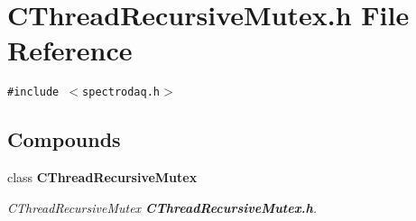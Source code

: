 \section{CThread\-Recursive\-Mutex.h File Reference}
\label{CThreadRecursiveMutex_8h}
{\tt \#include $<$spectrodaq.h$>$}\par
\subsection*{Compounds}
\begin{CompactItemize}
\item 
class {\bf CThread\-Recursive\-Mutex}
\begin{CompactList}\small\item\em CThread\-Recursive\-Mutex {\bf CThread\-Recursive\-Mutex.h}.\item\end{CompactList}\end{CompactItemize}
